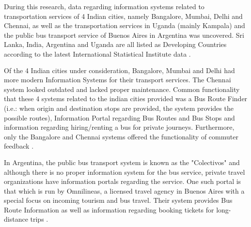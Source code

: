 During this research, data regarding information systems related to transportation services of 4 Indian cities, namely Bangalore, Mumbai, Delhi and Chennai, as well as the transportation services in Uganda (mainly Kampala) and the public bus transport service of Buenos Aires in Argentina was uncovered. Sri Lanka, India, Argentina and Uganda are all listed as Developing Countries according to the latest International Statistical Institute data \cite{ISI2013}.

Of the 4 Indian cities under consideration, Bangalore, Mumbai and Delhi had more modern Information Systems for their transport services. The Chennai system looked outdated and lacked proper maintenance. Common functionality that these 4 systems related to the indian cities provided was a Bus Route Finder (i.e.: when origin and destination stops are provided, the system provides the possible routes), Information Portal regarding Bus Routes and Bus Stops and information regarding hiring/renting a bus for private journeys. Furthermore, only the Bangalore and Chennai systems offered the functionality of commuter feedback \cite{BMTC1997, BEST1995, DTC2012, MTC2001}.

In Argentina, the public bus transport system is known as the "Colectivos" and although there is no proper information system for the bus service, private travel organizations have information portals regarding the service. One such portal is that which is run by Omnilineas, a licensed travel agency in Buenos Aires with a special focus on incoming tourism and bus travel. Their system provides Bus Route Information as well as information regarding booking tickets for long-distance trips \cite{Omnilineas2013}.